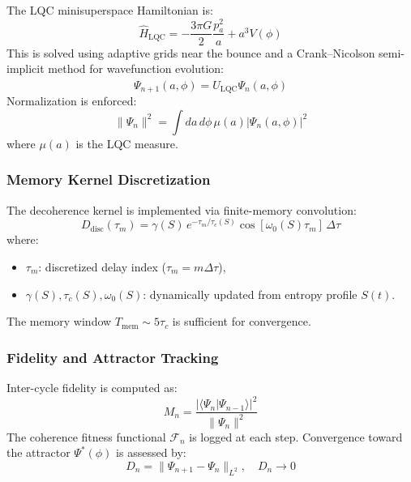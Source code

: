 The LQC minisuperspace Hamiltonian is:
\begin{equation}
\hat{H}_{\text{LQC}} = -\frac{3\pi G}{2} \frac{p_a^2}{a} + a^3 V(\phi)
\end{equation}
This is solved using adaptive grids near the bounce and a Crank–Nicolson semi-implicit method for wavefunction evolution:
\begin{equation}
\Psi_{n+1}(a,\phi) = \hat{U}_{\text{LQC}} \Psi_n(a,\phi)
\end{equation}
Normalization is enforced:
\begin{equation}
\|\Psi_n\|^2 = \int da \, d\phi \, \mu(a) |\Psi_n(a,\phi)|^2
\end{equation}
where \( \mu(a) \) is the LQC measure.

\subsubsection*{Memory Kernel Discretization}

The decoherence kernel is implemented via finite-memory convolution:
\begin{equation}
D_{\text{disc}}(\tau_m) = \gamma(S) \, e^{-\tau_m/\tau_c(S)} \cos[\omega_0(S) \tau_m] \, \Delta \tau
\end{equation}
where:
\begin{itemize}
  \item \( \tau_m \): discretized delay index (\( \tau_m = m \Delta \tau \)),
  \item \( \gamma(S), \tau_c(S), \omega_0(S) \): dynamically updated from entropy profile \( S(t) \).
\end{itemize}
The memory window \( T_{\text{mem}} \sim 5\tau_c \) is sufficient for convergence.

\subsubsection*{Fidelity and Attractor Tracking}

Inter-cycle fidelity is computed as:
\begin{equation}
M_n = \frac{|\langle \Psi_n | \Psi_{n-1} \rangle|^2}{\|\Psi_n\|^2}
\end{equation}
The coherence fitness functional \( \mathcal{F}_n \) is logged at each step. Convergence toward the attractor \( \Psi^*(\phi) \) is assessed by:
\begin{equation}
D_n = \| \Psi_{n+1} - \Psi_n \|_{L^2}, \quad D_n \to 0
\end{equation}

